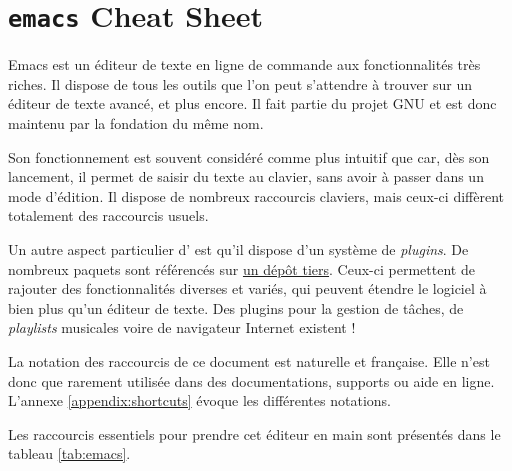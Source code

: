 \section{\texttt{emacs} Cheat Sheet} \label{appendix:emacs} 

Emacs est un éditeur de texte en ligne de commande aux fonctionnalités très riches. Il dispose de tous les outils que l'on peut s'attendre à trouver sur un éditeur de texte avancé, et plus encore. Il fait partie du projet GNU et est donc maintenu par la fondation du même nom.

Son fonctionnement est souvent considéré comme plus intuitif que  car, dès son lancement, il permet de saisir du texte au clavier, sans avoir à passer dans un mode d'édition. Il dispose de nombreux raccourcis claviers, mais ceux-ci diffèrent totalement des raccourcis usuels.

Un autre aspect particulier d' est qu'il dispose d'un système de \textit{plugins}. De nombreux paquets sont référencés sur \href{https://github.com/emacs-tw/awesome-emacs}{un dépôt tiers}. Ceux-ci permettent de rajouter des fonctionnalités diverses et variés, qui peuvent étendre le logiciel à bien plus qu'un éditeur de texte. Des plugins pour la gestion de tâches, de \textit{playlists} musicales voire de navigateur Internet existent !

 La notation des raccourcis de ce document est naturelle et française. Elle n'est donc que rarement utilisée dans des documentations, supports ou aide en ligne. L'annexe \ref{appendix:shortcuts} évoque les différentes notations.

Les raccourcis essentiels pour prendre cet éditeur en main sont présentés dans le tableau \ref{tab:emacs}.

